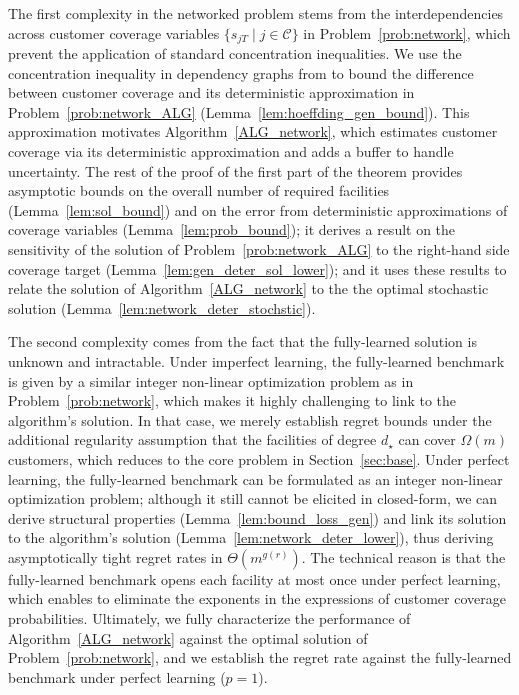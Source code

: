 \documentclass[nonblindrev]{informs3noheader}
\def\calC{\mathcal{C}}
\begin{document}
The first complexity in the networked problem stems from the interdependencies across customer coverage variables $\{s_{jT}\mid j\in\calC\}$ in Problem~\eqref{prob:network}, which prevent the application of standard concentration inequalities. We use the concentration inequality in dependency graphs from \cite{janisch2024berry} to bound the difference between customer coverage and its deterministic approximation in Problem~\eqref{prob:network_ALG} (Lemma~\ref{lem:hoeffding_gen_bound}). This approximation motivates Algorithm~\ref{ALG_network}, which estimates customer coverage via its deterministic approximation and adds a buffer to handle uncertainty. The rest of the proof of the first part of the theorem provides asymptotic bounds on the overall number of required facilities (Lemma~\ref{lem:sol_bound}) and on the error from deterministic approximations of coverage variables (Lemma~\ref{lem:prob_bound}); it derives a result on the sensitivity of the solution of Problem~\eqref{prob:network_ALG} to the right-hand side coverage target (Lemma~\ref{lem:gen_deter_sol_lower}); and it uses these results to relate the solution of Algorithm~\ref{ALG_network} to the the optimal stochastic solution (Lemma~\ref{lem:network_deter_stochstic}).

The second complexity comes from the fact that the fully-learned solution is unknown and intractable. Under imperfect learning, the fully-learned benchmark is given by a similar integer non-linear optimization problem as in Problem~\eqref{prob:network}, which makes it highly challenging to link to the algorithm's solution. In that case, we merely establish regret bounds under the additional regularity assumption that the facilities of degree $d_\star$ can cover $\Omega(m)$ customers, which reduces to the core problem in Section~\ref{sec:base}. Under perfect learning, the fully-learned benchmark can be formulated as an integer non-linear optimization problem; although it still cannot be elicited in closed-form, we can derive structural properties (Lemma~\ref{lem:bound_loss_gen}) and link its solution to the algorithm's solution (Lemma~\ref{lem:network_deter_lower}), thus deriving asymptotically tight regret rates in $\Theta(m^{g(r)})$. The technical reason is that the fully-learned benchmark opens each facility at most once under perfect learning, which enables to eliminate the exponents in the expressions of customer coverage probabilities. Ultimately, we fully characterize the performance of Algorithm~\ref{ALG_network} against the optimal solution of Problem~\eqref{prob:network}, and we establish the regret rate against the fully-learned benchmark under perfect learning ($p=1$).
\end{document}
